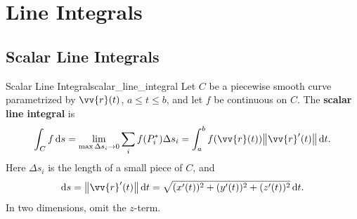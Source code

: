 \section{Line Integrals}
\subsection{Scalar Line Integrals}

\begin{definition}{Scalar Line Integral}{scalar_line_integral}
Let $C$ be a piecewise smooth curve parametrized by $\vv{r}(t)$, $a \le t \le b$, and let $f$ be continuous on $C$. The \textbf{scalar line integral} is
\[
    \int_C f\,\dd{s}
    = \lim_{\max\Delta s_i\to 0}\sum_i f(P_i^*)\Delta s_i
    = \int_a^b f(\vv{r}(t))\norm{\vv{r}'(t)}\,\dd{t}.
\]
Here $\Delta s_i$ is the length of a small piece of $C$, and
\[
    \dd{s} = \norm{\vv{r}'(t)}\,\dd{t}
    = \sqrt{(x'(t))^2 + (y'(t))^2 + (z'(t))^2}\,\dd{t}.
\]
In two dimensions, omit the $z$-term.


\end{definition}
